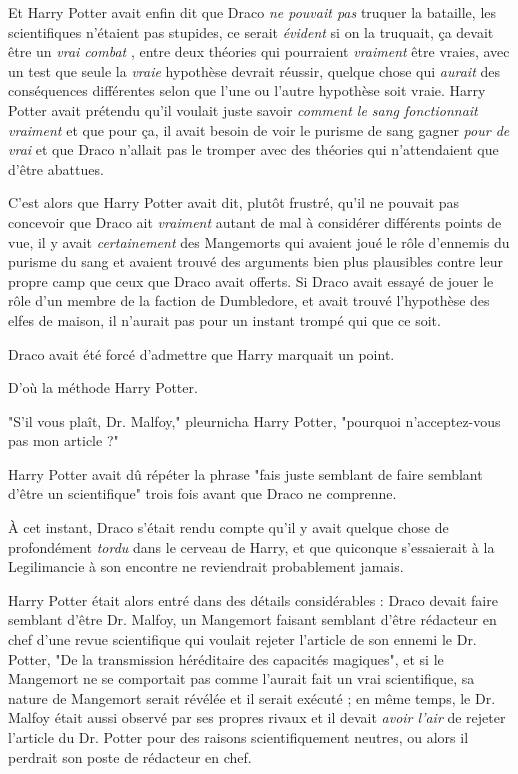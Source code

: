 Et Harry Potter avait enfin dit que Draco \emph{ne pouvait pas}  truquer la bataille, les scientifiques n'étaient pas stupides, ce serait \emph{évident}  si on la truquait, ça devait être un \emph{vrai combat} , entre deux théories qui pourraient \emph{vraiment}  être vraies, avec un test que seule la \emph{vraie}  hypothèse devrait réussir, quelque chose qui \emph{aurait}  des conséquences différentes selon que l'une ou l'autre hypothèse soit vraie. Harry Potter avait prétendu qu'il voulait juste savoir \emph{comment le sang fonctionnait vraiment}  et que pour ça, il avait besoin de voir le purisme de sang gagner \emph{pour de vrai}  et que Draco n'allait pas le tromper avec des théories qui n'attendaient que d'être abattues.

C'est alors que Harry Potter avait dit, plutôt frustré, qu'il ne pouvait pas concevoir que Draco ait \emph{vraiment}  autant de mal à considérer différents points de vue, il y avait \emph{certainement}  des Mangemorts qui avaient joué le rôle d'ennemis du purisme du sang et avaient trouvé des arguments bien plus plausibles contre leur propre camp que ceux que Draco avait offerts. Si Draco avait essayé de jouer le rôle d'un membre de la faction de Dumbledore, et avait trouvé l'hypothèse des elfes de maison, il n'aurait pas pour un instant trompé qui que ce soit.

Draco avait été forcé d'admettre que Harry marquait un point.

D'où la méthode Harry Potter.

"S'il vous plaît, Dr. Malfoy," pleurnicha Harry Potter, "pourquoi n'acceptez-vous pas mon article ?"

Harry Potter avait dû répéter la phrase "fais juste semblant de faire semblant d'être un scientifique" trois fois avant que Draco ne comprenne.

À cet instant, Draco s'était rendu compte qu'il y avait quelque chose de profondément \emph{tordu}  dans le cerveau de Harry, et que quiconque s'essaierait à la Legilimancie à son encontre ne reviendrait probablement jamais.

Harry Potter était alors entré dans des détails considérables : Draco devait faire semblant d'être Dr. Malfoy, un Mangemort faisant semblant d'être rédacteur en chef d'une revue scientifique qui voulait rejeter l'article de son ennemi le Dr. Potter, "De la transmission héréditaire des capacités magiques", et si le Mangemort ne se comportait pas comme l'aurait fait un vrai scientifique, sa nature de Mangemort serait révélée et il serait exécuté ; en même temps, le Dr. Malfoy était aussi observé par ses propres rivaux et il devait \emph{avoir l'air}  de rejeter l'article du Dr. Potter pour des raisons scientifiquement neutres, ou alors il perdrait son poste de rédacteur en chef.

